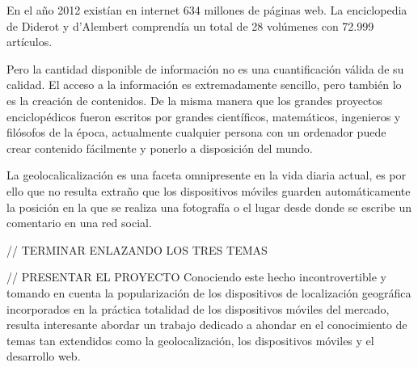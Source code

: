 En el año 2012 existían en internet 634 millones de páginas web. La enciclopedia de Diderot y d'Alembert comprendía un total de 28 volúmenes con 72.999 artículos. %

Pero la cantidad disponible de información no es una cuantificación válida de su calidad. El acceso a la información es extremadamente sencillo, pero también lo es la creación de contenidos. De la misma manera que los grandes proyectos enciclopédicos fueron escritos por grandes científicos, matemáticos, ingenieros y filósofos de la época, actualmente cualquier persona con un ordenador puede crear contenido fácilmente y ponerlo a disposición del mundo.

La geolocalicalización es una faceta omnipresente en la vida diaria actual, es por ello que no resulta extraño que los dispositivos móviles guarden automáticamente la posición en la que se realiza una fotografía o el lugar desde donde se escribe un comentario en una red social.

// TERMINAR ENLAZANDO LOS TRES TEMAS

// PRESENTAR EL PROYECTO
Conociendo este hecho incontrovertible y tomando en cuenta la popularización de los dispositivos de localización geográfica incorporados en la práctica totalidad de los dispositivos móviles del mercado, resulta interesante abordar un trabajo dedicado a ahondar en el conocimiento de temas tan extendidos como la geolocalización, los dispositivos móviles y el desarrollo web.



